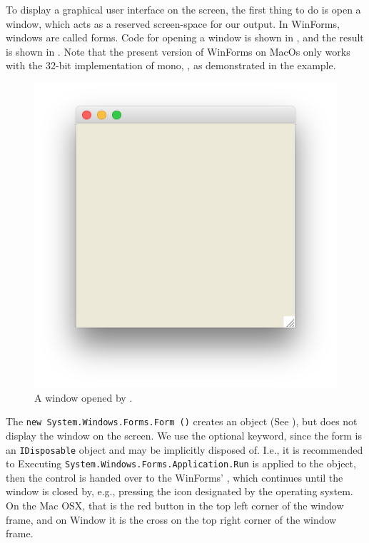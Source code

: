\documentclass[fsharpnotes.tex]{subfiles}
\begin{document}
To display a graphical user interface on the screen, the first thing to do is open a window, which acts as a reserved screen-space for our output. In WinForms, windows are called forms. Code for opening a window is shown in , and the result is shown in . Note that the present version of WinForms on MacOs only works with the 32-bit implementation of mono, , as demonstrated in the example.
%
%
%
%
\begin{figure}
  \centering
  \includegraphics[scale=0.3]{openWindow}
  \caption{A window opened by .}
  \label{fig:openWindow}
\end{figure}
The \lstinline!new System.Windows.Forms.Form ()! creates an object (See ), but does not display the window on the screen. We use the optional  keyword, since the form is an \lstinline{IDisposable} object and may be implicitly disposed of. I.e., it is recommended to  Executing \lstinline!System.Windows.Forms.Application.Run! is applied to the object, then the control is handed over to the WinForms' , which continues until the window is closed by, e.g., pressing the icon designated by the operating system. On the Mac OSX, that is the red button in the top left corner of the window frame, and on Window it is the cross on the top right corner of the window frame.
\end{document}
